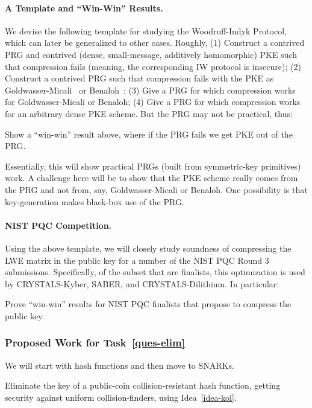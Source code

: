 \paragraph*{A Template and  ``Win-Win'' Results.}
We devise the following template for studying the Woodruff-Indyk Protocol, which can later be generalized to other cases.  Roughly, (1) Construct a contrived PRG and contrived (dense, small-message, additively homomorphic) PKE such that compression fails (meaning, the corresponding IW protocol is insecure); (2) Construct a contrived PRG such that compression fails with the PKE as Goldwasser-Micali~\cite{GolMic84} or Benaloh~\cite{SAC:Benaloh94}; (3) Give a PRG for which compression works for Goldwasser-Micali or Benaloh; (4) Give a PRG for which compression works for an arbitrary dense PKE scheme.  But the PRG  may not be practical, thus:
\begin{ques}
Show a ``win-win'' result above,  where if the PRG fails we get  PKE out of the PRG.
\end{ques}
Essentially, this will show practical PRGs  (built from symmetric-key primitives)  work.
A  challenge here will be to show that the PKE scheme really comes from the PRG and not from, say, Goldwasser-Micali or Benaloh.   One possibility is that key-generation makes black-box use of the PRG.

\paragraph*{NIST PQC Competition.}
Using the above template, we will closely study soundness of compressing the LWE matrix in the public key for a number  of the NIST PQC Round 3 submissions.  Specifically, of the subset that are  finalists, this optimization is used by CRYSTALS-Kyber, SABER, and CRYSTALS-Dilithium.    In particular:
\begin{ques}
Prove ``win-win'' results for NIST PQC finalists that propose to compress the public key.
\end{ques}

\subsubsection{Proposed Work for Task~\ref{ques-elim}}

We will start with hash functions and then move to SNARKs.

\begin{ques} \label{ques-hash}
Eliminate the key of a public-coin collision-resistant hash function, getting security against uniform collision-finders, using Idea~\ref{idea-kol}.
\end{ques}


